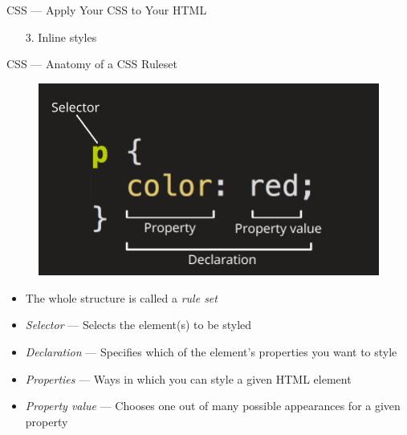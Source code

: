 \documentclass[aspectratio=169]{beamer}
\begin{document}
\begin{darkframes}
    \begin{frame}{CSS — Apply Your CSS to Your HTML}
        \begin{enumerate}
            \item [3.] Inline styles
        \end{enumerate}
        \cssInline
    \end{frame}

    \begin{frame}{CSS — Anatomy of a CSS Ruleset}
        \begin{figure}[h]
            \centering
            \includegraphics[width=0.4\linewidth]{resources/css-declaration-small.png}
        \end{figure}
        \begin{itemize}
            \item The whole structure is called a \textit{rule set}
            \item \textit{Selector} — Selects the element(s) to be styled
            \item \textit{Declaration} — Specifies which of the element's properties you want to style
            \item \textit{Properties} — Ways in which you can style a given HTML element
            \item \textit{Property value} — Chooses one out of many possible appearances for a given property
        \end{itemize}
    \end{frame}
    

\end{darkframes}
\end{document}
